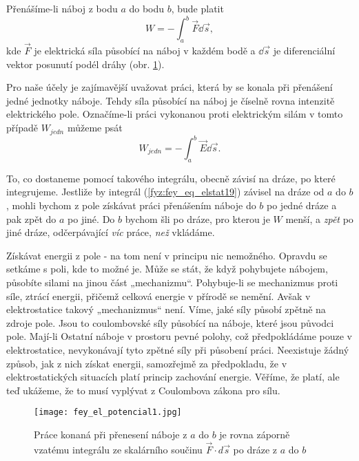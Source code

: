     Přenášíme-li náboj z bodu \(a\) do bodu \(b\), bude platit
    \begin{equation*}
      W = -\int_{a}^{b}\vec{F}\dd{\vec{s}},
    \end{equation*}
    kde \(\vec{F}\) je elektrická síla působící na náboj v každém bodě a \(\dd{\vec{s}}\) je 
    diferenciální vektor posunutí podél dráhy (obr. \ref{FYZ:fig_fey_potencial1}).
    
    Pro naše účely je zajímavější uvažovat práci, která by se konala při přenášení jedné jednotky 
    náboje. Tehdy síla působící na náboj je číselně rovna intenzitě elektrického pole. Označíme-li 
    práci vykonanou proti elektrickým silám v tomto případě \(W_{jedn}\) můžeme psát
    \begin{equation}\label{fyz:fey_eq_elstat19}
      W_{jedn} = -\int_{a}^{b}\vec{E}\dd{\vec{s}}.
    \end{equation}
    
    To, co dostaneme pomocí takového integrálu, obecně závisí na dráze, po které integrujeme. 
    Jestliže by integrál (\ref{fyz:fey_eq_elstat19}) závisel na dráze od \(a\) do \(b\), mohli 
    bychom z pole získávat práci přenášením náboje do \(b\) po jedné dráze a pak zpět do \(a\) po 
    jiné. Do \(b\) bychom šli po dráze, pro kterou je \(W\) menší, a \emph{zpět} po jiné dráze, 
    odčerpávající \emph{víc} práce, \emph{než} vkládáme.
    
    Získávat energii z pole - na tom není v principu nic nemožného. Opravdu se setkáme s poli, kde 
    to možné je. Může se stát, že když pohybujete nábojem, působíte silami na jinou část 
    „mechanizmu“. Pohybuje-li se mechanizmus proti síle, ztrácí energii, přičemž celková energie v 
    přírodě se nemění. Avšak v elektrostatice takový „mechanizmus“ není. Víme, jaké síly působí 
    zpětně na zdroje pole. Jsou to coulombovské síly působící na náboje, které jsou původci pole. 
    Mají-li Ostatní náboje v prostoru pevné polohy, což předpokládáme pouze v elektrostatice, 
    nevykonávají tyto zpětné síly při působení práci. Neexistuje žádný způsob, jak z nich získat 
    energii, samozřejmě za předpokladu, že v elektrostatických situacích platí princip zachování 
    energie. Věříme, že platí, ale teď ukážeme, že to musí vyplývat z Coulombova zákona pro 
    sílu.         
    
    \begin{figure}
      \texttt{[image: fey\_el\_potencial1.jpg]}
      \caption{Práce konaná při přenesení náboje z \(a\) do \(b\) je rovna záporně vzatému 
               integrálu ze skalárního součinu \(\vec{F}\cdot d\vec{s}\) po dráze z \(a\) do \(b\)}
      \label{FYZ:fig_fey_potencial1}
    \end{figure}
   
